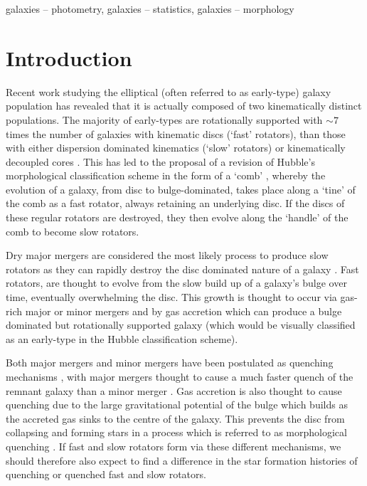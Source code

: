 \documentclass[useAMS,usenatbib]{mn2e}
\begin{document}
\begin{keywords}
galaxies -- photometry, galaxies -- statistics, galaxies -- morphology
\end{keywords}

\section{Introduction}\label{sec:intro}

Recent work studying the elliptical (often referred to as early-type) galaxy population has revealed that it is actually composed of two kinematically distinct populations. The majority of early-types are rotationally supported \citep{emsellem11} with $\sim7$ times the number of galaxies with kinematic discs (`fast' rotators), than those with either dispersion dominated kinematics (`slow' rotators) or kinematically decoupled cores \citep[which, along with slow rotators are collectively referred to as `non-regular' rotators;][]{cappellari07, emsellem07}.  This has led to the proposal of a revision of Hubble's morphological classification scheme in the form of a `comb' \citep{cappellari16}, whereby the evolution of a galaxy, from  disc to bulge-dominated, takes place along a `tine' of the comb as a fast rotator, always retaining an underlying disc. If the discs of these regular rotators are destroyed, they then evolve along the `handle' of the comb to become slow rotators. 

Dry major mergers are considered the most likely process to produce slow rotators \citep{duc11, naab14} as they can rapidly destroy the disc dominated nature of a galaxy \citep{toomre72}. %
Fast rotators, are thought to evolve from the slow build up of a galaxy's bulge over time, eventually overwhelming the disc. This growth is thought to occur via gas-rich major or minor mergers \citep{duc11} and by gas accretion \citep{cappellari13, johnston14} which can produce a bulge dominated but rotationally supported galaxy (which would be visually classified as an early-type in the Hubble classification scheme). %

Both major mergers and minor mergers have been postulated as quenching mechanisms \citep{hopkins08a, snyder11, hayward14}, with major mergers thought to cause a much faster quench of the remnant galaxy than a minor merger \citep{lotz08b, lotz11}. Gas accretion is also thought to cause quenching due to the large gravitational potential of the bulge which builds as the accreted gas sinks to the centre of the galaxy. This prevents the disc from collapsing and forming stars in a process which is referred to as morphological quenching \citep{martig09, fang13}. If fast and slow rotators form via these different mechanisms, we should therefore also expect to find a difference in the star formation histories of quenching or quenched fast and slow rotators. 
\end{document}
